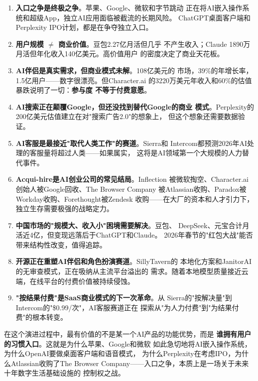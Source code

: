 \begin{corebox}[本章九大赛道的结构性洞察]
\begin{enumerate}
  \item \textbf{入口之争是终极之争}。苹果、Google、微软和字节跳动
    正在将AI嵌入操作系统和超级App，独立AI应用面临被截流的长期风险。
    ChatGPT桌面客户端和Perplexity IPO计划，都是在争夺独立入口。
  \item \textbf{用户规模 $\neq$ 商业价值}。豆包2.27亿月活但几乎
    不产生收入；Claude 1890万月活但年化收入140亿美元。高价值用户
    的密度决定了商业天花板。
  \item \textbf{AI伴侣是真实需求，但商业模式未解}。108亿美元的
    市场，39\%的年增长率，1.5亿用户——数字很漂亮。但Character.ai
    的3220万美元年收入和60\%的估值暴跌说明了一切：\textbf{参与度
    不等于付费意愿}。
  \item \textbf{AI搜索正在颠覆Google，但还没找到替代Google的商业
    模式}。Perplexity的200亿美元估值建立在对"搜索广告2.0"的想象上，
    但这个想象还需要数据验证。
  \item \textbf{AI客服是最接近"取代人类工作"的赛道}。Sierra和
    Intercom都预测2026年AI处理的客服量将超过人类——如果属实，
    这将是AI领域第一个大规模的人力替代事件。
  \item \textbf{Acqui-hire是AI创业公司的常见结局}。Inflection
    被微软掏空、Character.ai创始人被Google回收、The Browser Company
    被Atlassian收购、Paradox被Workday收购、Forethought被Zendesk
    收购——在大厂的资本和人才引力下，独立生存需要极强的战略定力。
  \item \textbf{中国市场的"规模大、收入小"困境需要解决}。豆包、
    DeepSeek、元宝合计月活近4亿，但变现远落后于ChatGPT和Claude。
    2026年春节的"红包大战"能否带来结构性改变，值得追踪。
  \item \textbf{开源正在重塑AI伴侣和角色扮演赛道}。SillyTavern的
    本地化方案和JanitorAI的无审查模式，正在吸纳从主流平台溢出的
    需求。随着本地模型质量接近云端，在线平台的付费价值被持续侵蚀。
  \item \textbf{"按结果付费"是SaaS商业模式的下一次革命}。从
    Sierra的"按解决量"到Intercom的"\$0.99/次"，AI客服赛道正在
    探索从"为人力付费"到"为结果付费"的根本转变。
\end{enumerate}
\end{corebox}

在这个演进过程中，最有价值的不是某一个AI产品的功能优势，而是
\textbf{谁拥有用户的习惯入口}。这就是为什么苹果、Google和微软
如此急切地将AI嵌入操作系统，为什么OpenAI要做桌面客户端和语音模式，
为什么Perplexity在考虑IPO，为什么Atlassian收购了The Browser
Company——入口之争，本质上是一场关于未来十年数字生活基础设施的
控制权之战。

